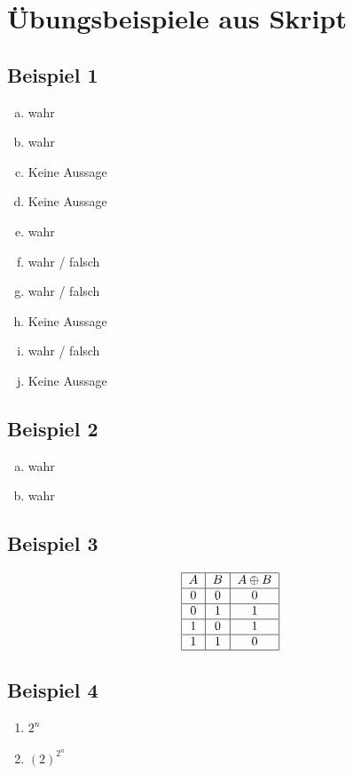 \documentclass[12pt, a4paper, oneside]{article}
\begin{document}
\newpage 
\section{Übungsbeispiele aus Skript} 
\subsection{Beispiel 1}
\begin{enumerate}[(a)]
  \item wahr
  \item wahr
  \item Keine Aussage
  \item Keine Aussage
  \item wahr
  \item wahr / falsch
  \item wahr / falsch
  \item Keine Aussage
  \item wahr / falsch
  \item Keine Aussage
\end{enumerate}

\subsection{Beispiel 2}
\begin{enumerate}[(a)]
  \item wahr
  \item wahr
\end{enumerate}

\subsection{Beispiel 3}
\begin{equation*}
  \begin{tabular}{| c | c | c |}
    \hline
    $A$ & $B$ & $A \oplus B$ \\ \hline
    0 & 0 & 0 \\ \hline
    0 & 1 & 1 \\ \hline
    1 & 0 & 1 \\ \hline
    1 & 1 & 0 \\ \hline
  \end{tabular}
\end{equation*}

\subsection{Beispiel 4}
\begin{enumerate}
  \item $2^{n}$
  \item $(2)^{2^{n}}$
\end{enumerate}
\end{document}
